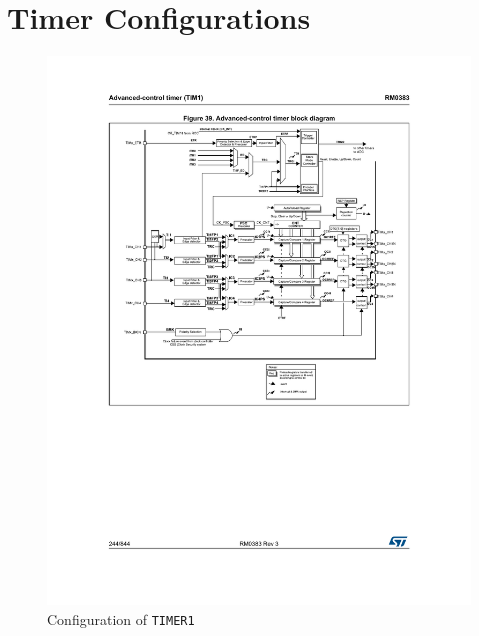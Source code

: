 
\chapter{Timer Configurations}
\begin{figure}[htbp]
	\centering
	\includegraphics[width=.8\textwidth]{Figures/4_advanced_timer1_diagram.pdf}
	\caption{Configuration of \texttt{TIMER1}}
	\label{fig:4_timer1}
\end{figure}
